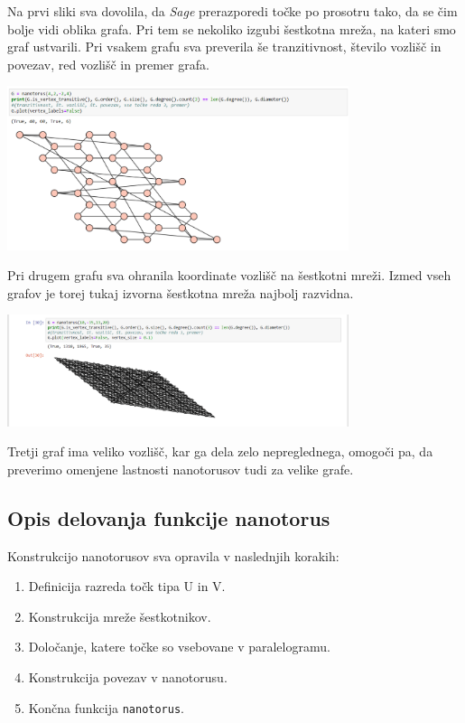 \documentclass[a4paper, 10 pt, titlepage]{article}
\begin{document}
Na prvi sliki sva dovolila, da \textit{Sage} prerazporedi točke po prosotru tako, da se čim bolje vidi oblika grafa. Pri tem se nekoliko izgubi šestkotna mreža, na kateri smo graf ustvarili. Pri vsakem grafu sva preverila še tranzitivnost, število vozlišč in povezav, red vozlišč in premer grafa.
\vspace{1cm}

\begin{center}
\includegraphics[width=10cm]{nano1}
\end{center}
\vspace{1cm}

Pri drugem grafu sva ohranila koordinate vozlišč na šestkotni mreži. Izmed vseh grafov je torej tukaj izvorna šestkotna mreža najbolj razvidna.
\vspace{1cm}

\begin{center}
\includegraphics[width=10cm]{nano3}
\end{center}
\vspace{1cm}

Tretji graf ima veliko vozlišč, kar ga dela zelo nepreglednega, omogoči pa, da preverimo omenjene lastnosti nanotorusov tudi za velike grafe.

\subsection{Opis delovanja funkcije nanotorus}

Konstrukcijo nanotorusov sva opravila v naslednjih korakih:

\begin{enumerate}
\item Definicija razreda točk tipa U in V.
\item Konstrukcija mreže šestkotnikov.
\item Določanje, katere točke so vsebovane v paralelogramu.
\item Konstrukcija povezav v nanotorusu.
\item Končna funkcija \texttt{nanotorus}.
\end{enumerate}
\end{document}
